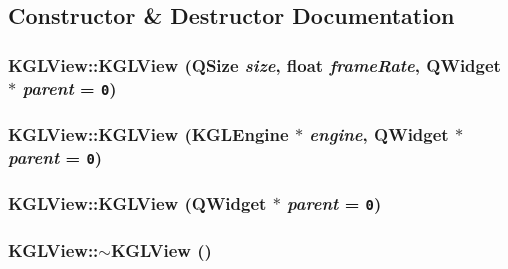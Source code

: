 \subsection{Constructor \& Destructor Documentation}
\hypertarget{class_k_g_l_view_8ea742580ef43e3fc2dae57c6c49702b}{
\subsubsection[{KGLView}]{\setlength{\rightskip}{0pt plus 5cm}KGLView::KGLView (QSize {\em size}, \/  float {\em frameRate}, \/  QWidget $\ast$ {\em parent} = {\tt 0})}}
\label{class_k_g_l_view_8ea742580ef43e3fc2dae57c6c49702b}


\hypertarget{class_k_g_l_view_b9286be5ea42882a1bc74e0d09911e0d}{
\subsubsection[{KGLView}]{\setlength{\rightskip}{0pt plus 5cm}KGLView::KGLView ({\bf KGLEngine} $\ast$ {\em engine}, \/  QWidget $\ast$ {\em parent} = {\tt 0})}}
\label{class_k_g_l_view_b9286be5ea42882a1bc74e0d09911e0d}


\hypertarget{class_k_g_l_view_986c271786b4615af0e6f49e9de8c58d}{
\subsubsection[{KGLView}]{\setlength{\rightskip}{0pt plus 5cm}KGLView::KGLView (QWidget $\ast$ {\em parent} = {\tt 0})}}
\label{class_k_g_l_view_986c271786b4615af0e6f49e9de8c58d}


\hypertarget{class_k_g_l_view_78519d715936803fdec2fad8f1d3c7a3}{
\subsubsection[{$\sim$KGLView}]{\setlength{\rightskip}{0pt plus 5cm}KGLView::$\sim$KGLView ()}}
\label{class_k_g_l_view_78519d715936803fdec2fad8f1d3c7a3}




